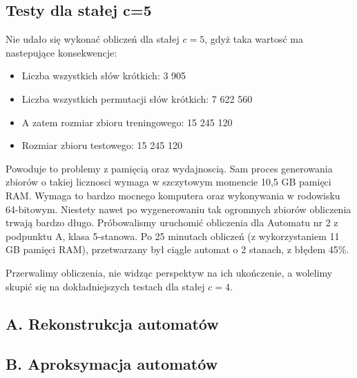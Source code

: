 \documentclass{../llncs_template_final/llncs}
\begin{document}
\subsection{Testy dla stałej c=5}
Nie udało się wykonać obliczeń dla stałej $c = 5$, gdyż taka wartosć ma nastepujące konsekwencje:
\begin{itemize}
\item Liczba wszystkich słów krótkich: 3 905
\item Liczba wszystkich permutacji słów krótkich: 7 622 560
\item A zatem rozmiar zbioru treningowego: 15 245 120
\item Rozmiar zbioru testowego: 15 245 120
\end{itemize}

Powoduje to problemy z pamięcią oraz wydajnoscią. Sam proces generowania zbiorów o takiej licznosci wymaga w szczytowym momencie 10,5 GB pamięci RAM. Wymaga to bardzo mocnego komputera oraz wykonywania w rodowisku 64-bitowym.
Niestety nawet po wygenerowaniu tak ogromnych zbiorów obliczenia trwają bardzo długo. Próbowalismy uruchomić obliczenia dla Automatu nr 2 z podpunktu A, klasa 5-stanowa. Po 25 minutach obliczeń (z wykorzystaniem 11 GB pamięci RAM), przetwarzany był ciągle automat o 2 stanach, z błędem 45\%. 

Przerwalimy obliczenia, nie widząc perspektyw na ich ukończenie, a wolelimy skupić się na dokładniejszych testach dla stałej $c = 4$.

\subsection{A. Rekonstrukcja automatów}

\subsection{B. Aproksymacja automatów}
\end{document}
